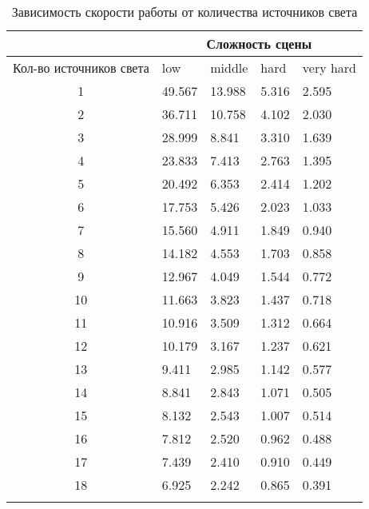 \begin{center}
\begin{longtable}{|c|p{2cm}|p{2cm}|p{2cm}|p{2cm}|}
\hline & \multicolumn{4}{c|}{Сложность сцены} \\ 
\hline Кол-во источников света & low & middle & hard &  very hard\\ 
\hline 1 &  49.567 & 13.988 & 5.316 & 2.595 \\ 
\hline 2 &  36.711 & 10.758 & 4.102 & 2.030 \\ 
\hline 3 &  28.999 & 8.841 & 3.310 & 1.639 \\ 
\hline 4 &  23.833 & 7.413 & 2.763 & 1.395 \\ 
\hline 5 &  20.492 & 6.353 & 2.414 & 1.202 \\ 
\hline 6 &  17.753 & 5.426 & 2.023 & 1.033 \\ 
\hline 7 &  15.560 & 4.911 & 1.849 & 0.940 \\ 
\hline 8 &  14.182 & 4.553 & 1.703 & 0.858 \\ 
\hline 9 &  12.967 & 4.049 & 1.544 & 0.772 \\ 
\hline 10 &  11.663 & 3.823 & 1.437 & 0.718 \\ 
\hline 11 &  10.916 & 3.509 & 1.312 & 0.664 \\ 
\hline 12 &  10.179 & 3.167 & 1.237 & 0.621 \\ 
\hline 13 &  9.411 & 2.985 & 1.142 & 0.577 \\ 
\hline 14 &  8.841 & 2.843 & 1.071 & 0.505 \\ 
\hline 15 &  8.132 & 2.543 & 1.007 & 0.514 \\ 
\hline 16 &  7.812 & 2.520 & 0.962 & 0.488 \\ 
\hline 17 &  7.439 & 2.410 & 0.910 & 0.449 \\ 
\hline 18 &  6.925 & 2.242 & 0.865 & 0.391 \\ 
\hline
\caption{Зависимость скорости работы от количества источников света}\label{tab:performance_light}\end{longtable}
\end{center}


